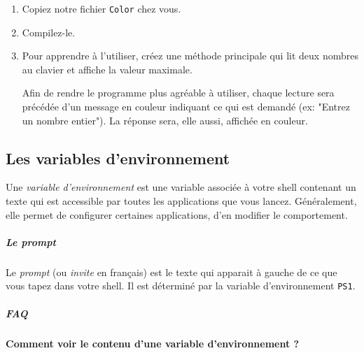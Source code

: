 \documentclass[a4paper,11pt]{article}
\begin{document}
			
		\begin{Exercice}{}
		
			\begin{enumerate}
				
				\item Copiez notre fichier \verb_Color_ chez vous.
				
				\item Compilez-le.
				
				\item Pour apprendre \`a l'utiliser, cr\'eez une m\'ethode principale
					qui lit deux nombres au clavier et affiche la valeur maximale.
					\par
				
					Afin de rendre le programme plus agr\'eable \`a utiliser, chaque lecture sera pr\'ec\'ed\'ee
					d'un message en couleur indiquant ce qui est demand\'e (ex: "Entrez un nombre entier").
					La r\'eponse sera, elle aussi, affich\'ee en couleur.
				
			\end{enumerate}
		\end{Exercice}
        
			

	\subsection{Les variables d'environnement}
		Une \textit{variable d'environnement} est une variable associ\'ee \`a votre shell contenant un texte qui est accessible par toutes
		les applications que vous lancez. G\'en\'eralement, elle permet de configurer certaines applications, d'en modifier le comportement.
			
            \par
        
			
		\subparagraph{Le prompt} 
		
	         	\par
        
			Le \textit{prompt} (ou \textit{invite} en fran\c cais) est le texte qui apparait \`a gauche
			de ce que vous tapez dans votre shell. Il est d\'etermin\'e par la variable d'environnement \verb_PS1_.
			
            		\par
        
			
		\subparagraph{FAQ} 
           		
        \par
        			\textbf{Comment voir le contenu d'une variable d'environnement ?}
           		 \par
        
\end{document}
